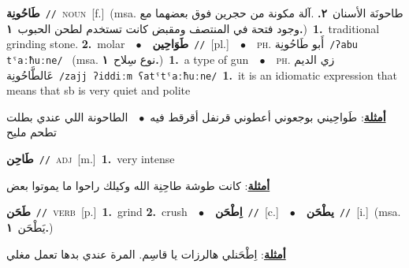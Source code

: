 \documentclass[10pt,a4paper,twoside]{article} %
\begin{document}
\begin{multicols}{2}
{\setlength\topsep{0pt}\textbf{\foreignlanguage{arabic}{طَاحُونِة}}\ {\color{gray}\texttt{//}\color{black}}\ \textsc{noun}\ [f.]\ \color{gray}(msa. \foreignlanguage{arabic}{طاحونَة الأسنان}~\foreignlanguage{arabic}{\textbf{٢.}}  .\foreignlanguage{arabic}{آلة مكونة من حجرين فوق بعضهما مع وجود فتحة في المنتصف ومقبض كانت تستخدم لطحن الحبوب}~\foreignlanguage{arabic}{\textbf{١.}})\color{black}\ \textbf{1.}~traditional grinding stone.  \textbf{2.}~molar\ \ $\bullet$\ \ \setlength\topsep{0pt}\textbf{\foreignlanguage{arabic}{طَوَاحِين}}\ {\color{gray}\texttt{//}\color{black}}\ [pl.]\ \ $\bullet$\ \ \textsc{ph.} \color{gray} \foreignlanguage{arabic}{أَبو طَاحُونِة}\color{black}\ {\color{gray}\texttt{/{\sffamily ʔabu tˤaːħuːne}/}\color{black}}\ \color{gray} (msa. \foreignlanguage{arabic}{نوع سِلاح}~\foreignlanguage{arabic}{\textbf{١.}})\color{black}\ \textbf{1.}~a type of gun\ \ $\bullet$\ \ \textsc{ph.} \color{gray} \foreignlanguage{arabic}{زي الديم عَالطَّاحُونِة}\color{black}\ {\color{gray}\texttt{/{\sffamily zajj ʔiddiːm ʕatˤtˤaːħuːne}/}\color{black}}\ \textbf{1.}~it is an idiomatic expression that means that sb is very quiet and polite\  \begin{flushright}\color{gray}\foreignlanguage{arabic}{\textbf{\underline{\foreignlanguage{arabic}{أمثلة}}}: طَواحِيني بوجعوني أعطوني قرنفل أقرقط فيه\ $\bullet$\ \  الطاحونة اللي عندي بطلت تطحم مليح}\end{flushright}\color{black}} \vspace{2mm}

{\setlength\topsep{0pt}\textbf{\foreignlanguage{arabic}{طَاحِن}}\ {\color{gray}\texttt{//}\color{black}}\ \textsc{adj}\ [m.]\ \textbf{1.}~very intense\  \begin{flushright}\color{gray}\foreignlanguage{arabic}{\textbf{\underline{\foreignlanguage{arabic}{أمثلة}}}: كانت طوشة طاحِنِة الله وكيلك راحوا ما يموتوا بعض}\end{flushright}\color{black}} \vspace{2mm}

{\setlength\topsep{0pt}\textbf{\foreignlanguage{arabic}{طَحَن}}\ {\color{gray}\texttt{//}\color{black}}\ \textsc{verb}\ [p.]\ \textbf{1.}~grind  \textbf{2.}~crush\ \ $\bullet$\ \ \setlength\topsep{0pt}\textbf{\foreignlanguage{arabic}{اِطْحَن}}\ {\color{gray}\texttt{//}\color{black}}\ [c.]\ \ $\bullet$\ \ \setlength\topsep{0pt}\textbf{\foreignlanguage{arabic}{يطْحَن}}\ {\color{gray}\texttt{//}\color{black}}\ [i.]\ \color{gray}(msa. \foreignlanguage{arabic}{يَطْحَن}~\foreignlanguage{arabic}{\textbf{١.}})\color{black}\  \begin{flushright}\color{gray}\foreignlanguage{arabic}{\textbf{\underline{\foreignlanguage{arabic}{أمثلة}}}: اِطْحَنلي هالرزات يا قاسِم. المرة عندي بدها تعمل مغلي}\end{flushright}\color{black}} \vspace{2mm}


\end{multicols}
\end{document}
